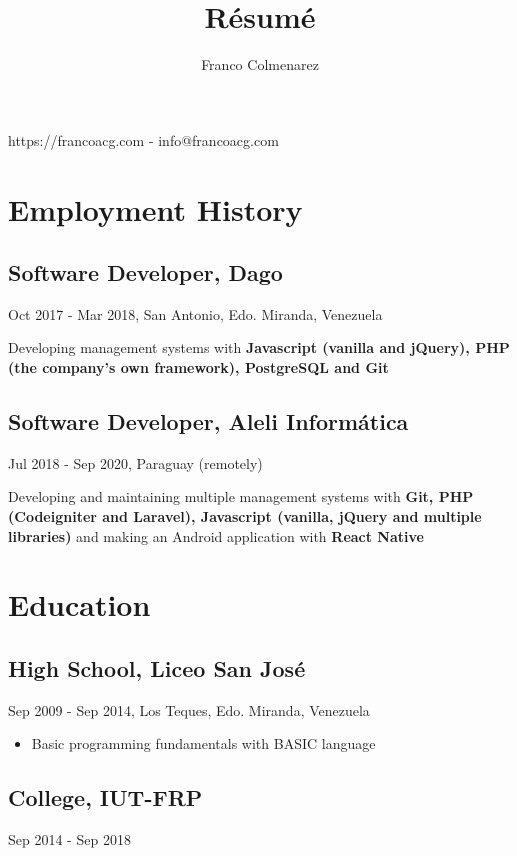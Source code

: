 \documentclass{article}
\author{Franco Colmenarez}
\title{R\'esum\'e}
\makeatletter
\renewcommand{\maketitle}{
\begin{center}
{\huge\bfseries\theauthor}

\vspace{.25em}

https://francoacg.com - info@francoacg.com

\end{center}
}
\makeatother
\begin{document}
\maketitle

\section{Employment History}

\subsection{Software Developer, Dago}

Oct 2017 - Mar 2018, San Antonio, Edo. Miranda, Venezuela

Developing management systems with \textbf{Javascript (vanilla and jQuery), PHP (the company's own framework), PostgreSQL and Git}

\subsection{Software Developer, Aleli Inform\'atica}

Jul 2018 - Sep 2020, Paraguay (remotely)

Developing and maintaining multiple management systems with
\textbf{Git, PHP (Codeigniter and Laravel), Javascript (vanilla, jQuery and multiple libraries)}
and making an Android application with \textbf{React Native}

\section{Education}

\subsection{High School, Liceo San Jos\'e}

Sep 2009 - Sep 2014, Los Teques, Edo. Miranda, Venezuela

\begin{itemize}
    \item Basic programming fundamentals with BASIC language
\end{itemize}

\subsection{College, IUT-FRP}

Sep 2014 - Sep 2018
\end{document}
